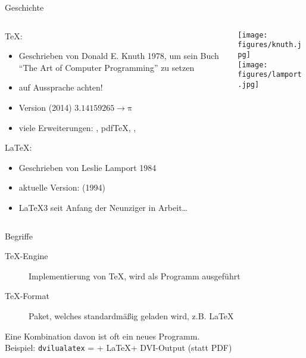 \begin{frame}{Geschichte}
  \begin{columns}
    \begin{column}{0.75\textwidth}
      \TeX:
      \begin{itemize}
        \item Geschrieben von Donald E. Knuth 1978, um sein Buch \enquote{The Art of Computer Programming} zu setzen
        \item auf Aussprache achten!
        \item Version (2014) $3.14159265 → \mathup{π}$
        \item viele Erweiterungen: \eTeX, pdf\TeX, \XeTeX, \LuaTeX
      \end{itemize}

      \vspace{10pt}
      \LaTeX:
      \begin{itemize}
        \item Geschrieben von Leslie Lamport 1984
        \item aktuelle Version: \LaTeXe (1994)
        \item \LaTeX3 seit Anfang der Neunziger in Arbeit\dots
      \end{itemize}
    \end{column}
    \begin{column}{0.25\textwidth}
      \texttt{[image: figures/knuth.jpg]}\\
      \texttt{[image: figures/lamport.jpg]}
    \end{column}
  \end{columns}
\end{frame}

\begin{frame}{Begriffe}
  \begin{description}
    \item[\TeX-Engine] Implementierung von \TeX, wird als Programm ausgeführt
    \item[\TeX-Format] Paket, welches standardmäßig geladen wird, z.B. \LaTeX
  \end{description}

  \vspace{10pt}
  Eine Kombination davon ist oft ein neues Programm.\\[10pt]
  Beispiel: \texttt{dvilualatex} = \LuaTeX + \LaTeX + DVI-Output (statt PDF)
\end{frame}

